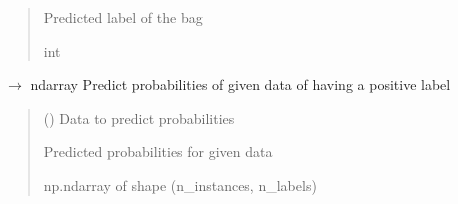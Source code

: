 \documentclass[letterpaper,10pt,english]{sphinxmanual}
\begin{document}
\begin{fulllineitems}
\begin{fulllineitems}
\begin{quote}
\begin{description}
\sphinxAtStartPar
{} \textendash{} Predicted label of the bag

\sphinxAtStartPar
int

\end{description}\end{quote}

\end{fulllineitems}


\begin{fulllineitems}
\label{\detokenize{classifier/mi/_autosummary/miml.classifier.mi.mi_wrapper_classifier.MIWrapperClassifier:miml.classifier.mi.mi_wrapper_classifier.MIWrapperClassifier.predict_proba}}
\pysigstartsignatures
\pysiglinewithargsret
{}
{}
{{ $\rightarrow$ ndarray}}
\pysigstopsignatures
\sphinxAtStartPar
Predict probabilities of given data of having a positive label
\begin{quote}\begin{description}
\sphinxAtStartPar
{} (\sphinxstyleliteralemphasis{\sphinxupquote{ (}}\sphinxstyleliteralemphasis{\sphinxupquote{, }}\sphinxstyleliteralemphasis{\sphinxupquote{, }}\sphinxstyleliteralemphasis{\sphinxupquote{)}}) \textendash{} Data to predict probabilities

\sphinxAtStartPar
{} \textendash{} Predicted probabilities for given data

\sphinxAtStartPar
np.ndarray of shape (n\_instances, n\_labels)

\end{description}\end{quote}

\end{fulllineitems}


\end{fulllineitems}
\end{document}
